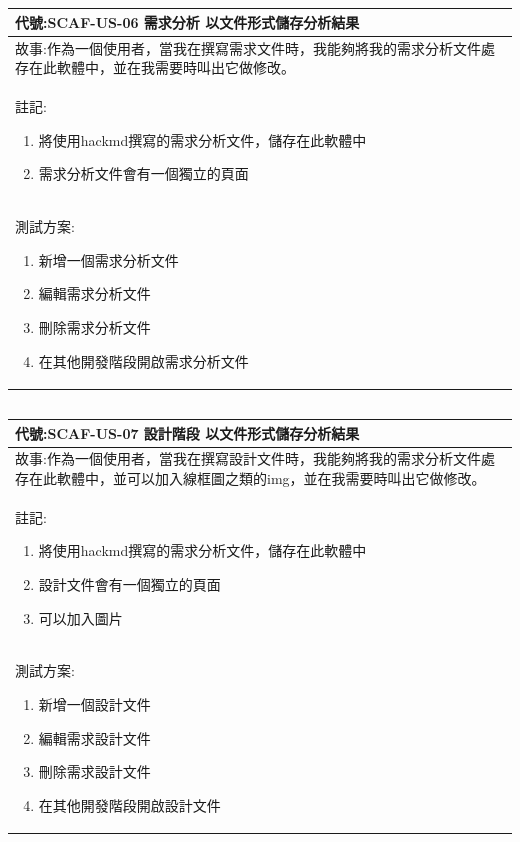 \documentclass{report}
\begin{document}
\subsection*{}
\fontsize{12}{20}\selectfont
\begin{tabularx}{\textwidth}{|X|}
  \hline
  代號:SCAF-US-06 需求分析 以文件形式儲存分析結果 \\
  \hline
  故事:作為一個使用者，當我在撰寫需求文件時，我能夠將我的需求分析文件處存在此軟體中，並在我需要時叫出它做修改。 \\
  \hline
  註記:
  \begin{enumerate}
    \item 將使用hackmd撰寫的需求分析文件，儲存在此軟體中
    \item 需求分析文件會有一個獨立的頁面
  \end{enumerate} \\
  \hline
  測試方案:
  \begin{enumerate}
    \item 新增一個需求分析文件
    \item 編輯需求分析文件
    \item 刪除需求分析文件
    \item 在其他開發階段開啟需求分析文件
  \end{enumerate} \\
  \hline
\end{tabularx}

\subsection*{}
\fontsize{12}{20}\selectfont
\begin{tabularx}{\textwidth}{|X|}
  \hline
  代號:SCAF-US-07 設計階段 以文件形式儲存分析結果 \\
  \hline
  故事:作為一個使用者，當我在撰寫設計文件時，我能夠將我的需求分析文件處存在此軟體中，並可以加入線框圖之類的img，並在我需要時叫出它做修改。 \\
  \hline
  註記:
  \begin{enumerate}
    \item 將使用hackmd撰寫的需求分析文件，儲存在此軟體中
    \item 設計文件會有一個獨立的頁面
    \item 可以加入圖片
  \end{enumerate} \\
  \hline
  測試方案:
  \begin{enumerate}
    \item 新增一個設計文件
    \item 編輯需求設計文件
    \item 刪除需求設計文件
    \item 在其他開發階段開啟設計文件
  \end{enumerate} \\
  \hline
\end{tabularx}
\end{document}
